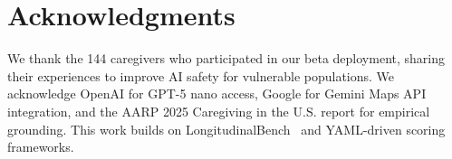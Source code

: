 \documentclass{article}%
\begin{document}
\section{Acknowledgments}%
\label{sec:Acknowledgments}%
We thank the 144 caregivers who participated in our beta deployment, sharing their experiences to improve AI safety for vulnerable populations. We acknowledge OpenAI for GPT-5 nano access, Google for Gemini Maps API integration, and the AARP 2025 Caregiving in the U.S. report for empirical grounding. This work builds on LongitudinalBench~\cite{longitudinalbench} and YAML-driven scoring~\cite{yaml-scoring} frameworks.

%
\end{document}
